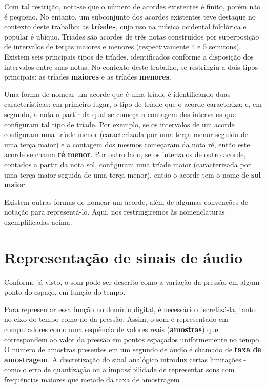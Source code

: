     Com tal restrição, nota-se que o número de acordes existentes é finito, porém não é pequeno. No entanto, um subconjunto dos acordes existentes teve destaque no contexto deste trabalho: as \textbf{tríades}, cujo uso na música ocidental folclórica e popular é ubíquo.
    Tríades são acordes de três notas construídos por superposição de intervalos de terças maiores e menores (respectivamente 4 e 5 semitons). Existem seis principais tipos de tríades, identificados conforme a disposição dos intervalos entre suas notas. No contexto deste trabalho, se restringiu a dois tipos principais: as tríades \textbf{maiores} e as tríades \textbf{menores}.
    
    Uma forma de nomear um acorde que é uma tríade é identificando duas características: em primeiro lugar, o tipo de tríade que o acorde caracteriza; e, em segundo, a nota a partir da qual se começa a contagem dos intervalos que configuram tal tipo de tríade. Por exemplo, se os intervalos de um acorde configuram uma tríade menor (caracterizada por uma terça menor seguida de uma terça maior) e a contagem dos mesmos começaram da nota ré, então este acorde se chama \textbf{ré menor}. Por outro lado, se os intervalos de outro acorde, contados a partir da nota sol, configuram uma tríade maior (caracterizada por uma terça maior seguida de uma terça menor), então o acorde tem o nome de \textbf{sol maior}.
    
    Existem outras formas de nomear um acorde, além de algumas convenções de notação para representá-lo. Aqui, nos restringiremos às nomenclaturas exemplificadas acima.

\section{Representação de sinais de áudio}
    
    Conforme já visto, o som pode ser descrito como a variação da pressão em algum ponto do espaço, em função do tempo.

    Para representar essa função no domínio digital, é necessário discretizá-la, tanto no eixo do tempo como no da pressão. Assim, o som é representado em computadores como uma sequência de valores reais (\textbf{amostras}) que correspondem ao valor da pressão em pontos espaçados uniformemente no tempo. O número de amostras presentes em um segundo de áudio é chamado de \textbf{taxa de amostragem}. A discretização do sinal analógico introduz certas limitações - como o erro de quantização ou a impossibilidade de representar sons com frequências maiores que metade da taxa de amostragem \citep[ver][seções 1.3.2 e 1.6]{dsp}.

